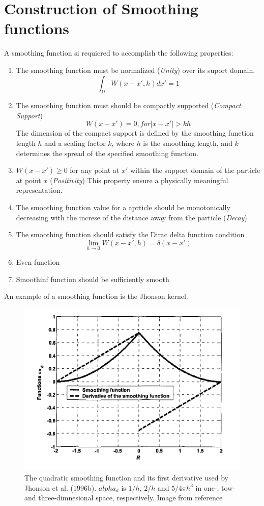 \documentclass[12pt]{thesis}
\begin{document}
\section{Construction of Smoothing functions}
A smoothing function si requiered to accomplish the following properties:
\begin{enumerate}
\item The smoothing function must be normalized (\textit{Unity}) over its suport domain.
\[\int_{\Omega}{W(x-x',h)dx'}=1\]
\item The smoothing function must should be compactly supported (\textit{Compact Support})
\[W(x-x')=0,for|x-x'|>kh\]
The dimension of the compact support is defined by the smoothing function length $h$ and a scaling factor $k$, where $h$ is the smoothing length, and $k$ determines the spread of the specified smoothing function.
\item $W(x-x')\geq0$ for any point at $x'$ within the support domain of the particle at point $x$ (\textit{Positivity}) This property ensure a physically meaningful representation.
\item The smoothing function value for a aprticle should be monotonically decreasing with the increse of the distance away from the particle (\textit{Decay})
\item The smoothing function should satisfy the Dirac delta function condition
\[\lim_{h\to0}{W(x-x',h)}=\delta(x-x')\]
\item Even function
\item Smoothinf function should be sufficiently smooth
\end{enumerate}

An example of a smoothing function is the Jhonson kernel. 
\begin{figure}[h!]
\centering
\includegraphics[scale=.8]{./images/JohnsonKernel.png}
\caption{The quadratic smoothing function and its first derivative used by Jhonson et al. (1996b). $alpha_d$ is $1/h$, $2/h$ and $5/4\pi h^3$ in one-, tow- and three-dimnesional space, respectively. Image from reference \cite{Liu_SPH}}
\label{JohnsonKernel}
\end{figure}
\end{document}
